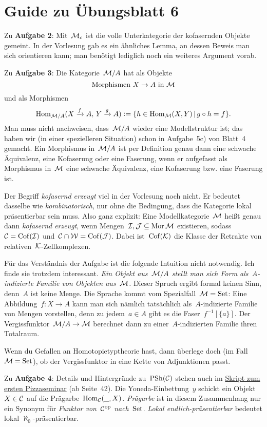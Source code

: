 \documentclass{uebblatt}
\begin{document}
\section*{Guide zu Übungsblatt 6}

Zu \textbf{Aufgabe 2}: Mit~$\mathcal{M}_c$ ist die volle Unterkategorie der kofasernden
Objekte gemeint. In der Vorlesung gab es ein ähnliches Lemma, an dessen Beweis
man sich orientieren kann; man benötigt lediglich noch ein weiteres Argument
vorab.

Zu \textbf{Aufgabe 3}: Die Kategorie~$\mathcal{M}/A$ hat als Objekte
\[ \text{Morphismen~$X \to A$ in~$\mathcal{M}$} \]
und als Morphismen
\[ \mathrm{Hom}_{\mathcal{M}/A}(X \xrightarrow{f} A,\, Y \xrightarrow{g} A) \vcentcolon= \{ h \in \mathrm{Hom}_{\mathcal{M}}(X,Y) \,|\,
  g \circ h = f \}. \]
Man muss nicht nachweisen, dass~$\mathcal{M}/A$ wieder eine Modellstruktur ist; das
haben wir (in einer spezielleren Situation) schon in Aufgabe~5c) von Blatt~4
gemacht. Ein Morphismus in~$\mathcal{M}/A$ ist per Definition genau dann eine schwache
Äquivalenz, eine Kofaserung oder eine Faserung, wenn er aufgefasst als
Morphismus in~$\mathcal{M}$ eine schwache Äquivalenz, eine Kofaserung bzw. eine Faserung
ist.

Der Begriff \emph{kofasernd erzeugt} viel in der Vorlesung noch nicht. Er
bedeutet dasselbe wie \emph{kombinatorisch}, nur ohne die Bedingung, dass die
Kategorie lokal präsentierbar sein muss. Also ganz explizit: Eine
Modellkategorie~$\mathcal{M}$ heißt genau dann \emph{kofasernd erzeugt}, wenn
Mengen~$\mathcal{I}, \mathcal{J} \subseteq \operatorname{Mor} \mathcal{M}$ existieren, sodass~$\mathcal{C} = \mathrm{Cof}(\mathcal{I})$ und~$\mathcal{C} \cap
\mathcal{W} = \mathrm{Cof}(\mathcal{J})$. Dabei ist~$\mathrm{Cof}(\mathcal{K})$ die Klasse der Retrakte von
relativen~$\mathcal{K}$-Zellkomplexen.

Für das Verständnis der Aufgabe ist die folgende Intuition nicht notwendig. Ich
finde sie trotzdem interessant. \emph{Ein Objekt aus~$\mathcal{M}/A$ stellt man sich Form
als~$A$-indizierte Familie von Objekten aus~$\mathcal{M}$.} Dieser Spruch ergibt formal
keinen Sinn, denn~$A$ ist keine Menge. Die Sprache kommt vom Spezialfall~$\mathcal{M} =
\mathrm{Set}$: Eine Abbildung~$f : X \to A$ kann man sich nämlich tatsächlich
als~$A$-indizierte Familie von Mengen vorstellen, denn zu jedem~$a \in A$ gibt
es die Faser~$f^{-1}[\{a\}]$. Der Vergissfunktor~$\mathcal{M}/A \to \mathcal{M}$ berechnet dann
zu einer~$A$-indizierten Familie ihren Totalraum.

Wenn du Gefallen an Homotopietyptheorie hast, dann überlege doch (im Fall~$\mathcal{M} =
\mathrm{Set}$), ob der Vergissfunktor in eine Kette von Adjunktionen passt.

Zu \textbf{Aufgabe 4}: Details und Hintergründe zu~$\mathrm{PSh}(\mathcal{C})$ stehen auch im
\href{http://pizzaseminar.speicherleck.de/skript1/pizzaseminar.pdf}{Skript zum ersten
Pizzaseminar} (ab Seite~42). Die Yoneda-Einbettung~$y$ schickt ein Objekt~$X
\in \mathcal{C}$ auf die Prägarbe~$\mathrm{Hom}_{\mathcal{C}}(\underline{\ \ }, X)$. \emph{Prägarbe} ist
in diesem Zusammenhang nur ein Synonym für \emph{Funktor von~$\mathcal{C}^{\mathrm{op}}$
nach~$\mathrm{Set}$}. \emph{Lokal endlich-präsentierbar} bedeutet lokal
$\aleph_0$-präsentierbar.
\end{document}
